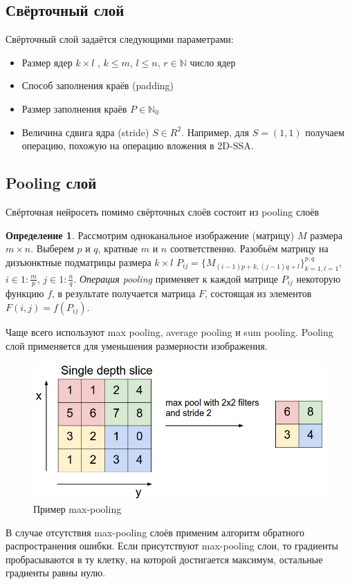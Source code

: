 \documentclass{article}
\renewcommand{\leq}{\leqslant}
\theoremstyle{definition}
\newtheorem{definition}{Определение}
\theoremstyle{theorem}
\theoremstyle{remark}
\theoremstyle{theorem}
\theoremstyle{example}
\theoremstyle{theorem}
\theoremstyle{theorem}
\theoremstyle{theorem}
\theoremstyle{theorem}
\begin{document}
	 \subsection{Свёрточный слой}
	 	Свёрточный слой задаётся следующими параметрами:
	 	\begin{itemize}
	 		\item Размер ядер $k\times l$ , $k\leq m$, $l\leq n$, $r\in\mathbb N$ число ядер
	 		\item Способ заполнения краёв (padding)
	 		\item Размер заполнения краёв $P\in \mathbb N_0$
	 		\item Величина сдвига ядра (stride) $S\in R^2$. Например, для $S=(1,1)$ получаем операцию, похожую на операцию вложения в 2D-SSA.
	 	\end{itemize}
	 \subsection{ Pooling слой}
	 	Свёрточная нейросеть помимо свёрточных слоёв состоит из pooling слоёв
	 	\begin{definition}
	 		Рассмотрим одноканальное изображение (матрицу)  $M$ размера $m\times n$. Выберем $p$ и $q$, кратные $m$ и $n$ соответственно. Разобьём матрицу на дизъюнктные подматрицы размера $k\times l$ $P_{ij}=\{M_{(i-1)p+k,(j-1)q+l}\}_{k=1,l=1}^{p,q}$, $i\in1:\frac mp$, $j\in1:\frac nq$. \textit{Операция pooling} применяет к каждой матрице $P_{ij}$ некоторую функцию $f$, в результате получается матрица $F$, состоящая из элементов $F(i,j)=f(P_{ij})$.
	 	\end{definition}
	 	
	 	Чаще всего используют max pooling, average pooling и sum pooling.
	 		Pooling слой применяется для уменьшения размерности изображения.
	 	\begin{figure}[ht!]\label{pool}
	 		\includegraphics[width=\textwidth]{maxpool.jpeg}\caption{Пример max-pooling}
	 	\end{figure}
	 В случае отсутствия max-pooling слоёв применим алгоритм обратного распространения ошибки. Если присутствуют max-pooling слои, то градиенты пробрасываются в ту клетку, на которой достигается максимум, остальные градиенты равны нулю.
	
\end{document}
